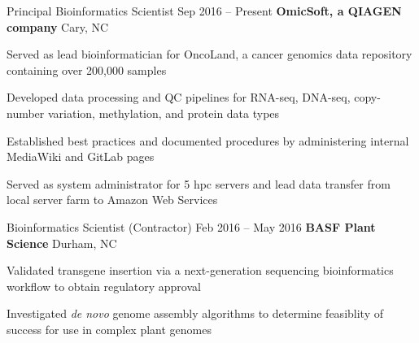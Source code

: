 
\begin{resentries}

  \resentry
    {Principal Bioinformatics Scientist}
    {Sep 2016 -- Present}
    {\textbf{OmicSoft, a QIAGEN company}} %
    {Cary, NC} %
    {
      \begin{cvitems} %
        \item{Served as lead bioinformatician for OncoLand, a cancer genomics data repository containing over 200,000 samples}
        \item{Developed data processing and QC pipelines for RNA-seq, DNA-seq, copy-number variation, methylation, and protein data types} 
        \item{Established best practices and documented procedures by administering internal MediaWiki and GitLab pages}
        \item{Served as system administrator for 5 hpc servers and lead data transfer from local server farm to Amazon Web Services}
      \end{cvitems}
    }

  \resentry
    {Bioinformatics Scientist (Contractor)}
    {Feb 2016 -- May 2016}
    {\textbf{BASF Plant Science}}
    {Durham, NC}
    {
      \begin{cvitems} %
        \item{Validated transgene insertion via a next-generation sequencing bioinformatics workflow to obtain regulatory approval}
        \item{Investigated \textit{de novo} genome assembly algorithms to determine feasiblity of success for use in complex plant genomes}
      \end{cvitems}
    }

\end{resentries}
\vspace{-2mm}
